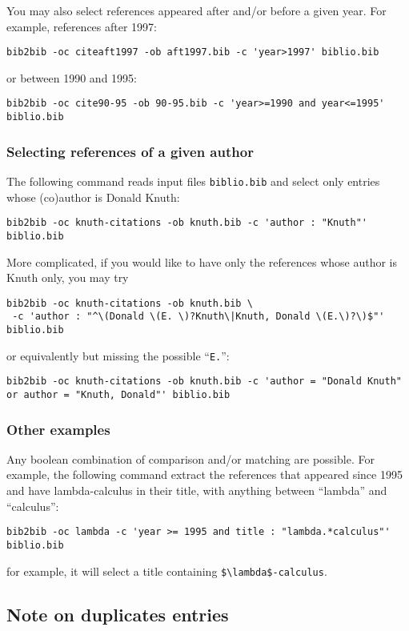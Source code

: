 \documentclass[11pt,a4paper]{article}
\begin{document}
You may also select references appeared after and/or before a given
year. For example, references after 1997:
\begin{verbatim}
bib2bib -oc citeaft1997 -ob aft1997.bib -c 'year>1997' biblio.bib 
\end{verbatim}
or between 1990 and 1995:
\begin{verbatim}
bib2bib -oc cite90-95 -ob 90-95.bib -c 'year>=1990 and year<=1995' biblio.bib 
\end{verbatim}

\subsubsection{Selecting references of a given author}

The following command reads input files \verb|biblio.bib| and select
only entries whose (co)author is Donald Knuth: 
\begin{verbatim}
bib2bib -oc knuth-citations -ob knuth.bib -c 'author : "Knuth"' biblio.bib
\end{verbatim}
More complicated, if you would like to have only the references whose
author is Knuth only, you may try
\begin{verbatim}
bib2bib -oc knuth-citations -ob knuth.bib \
 -c 'author : "^\(Donald \(E. \)?Knuth\|Knuth, Donald \(E.\)?\)$"' biblio.bib
\end{verbatim}
or equivalently but missing the possible ``\verb|E.|'':
\begin{verbatim}
bib2bib -oc knuth-citations -ob knuth.bib -c 'author = "Donald Knuth"
or author = "Knuth, Donald"' biblio.bib
\end{verbatim}

\subsubsection{Other examples}

Any boolean combination of comparison and/or matching are
possible. For example, the following command extract the references
that appeared since 1995 and have lambda-calculus in their title, with
anything between ``lambda'' and ``calculus'':
\begin{verbatim}
bib2bib -oc lambda -c 'year >= 1995 and title : "lambda.*calculus"' biblio.bib
\end{verbatim}
for example, it will select a title containing
\verb|$\lambda$-calculus|. 

\subsection{Note on duplicates entries}
 
\end{document}
